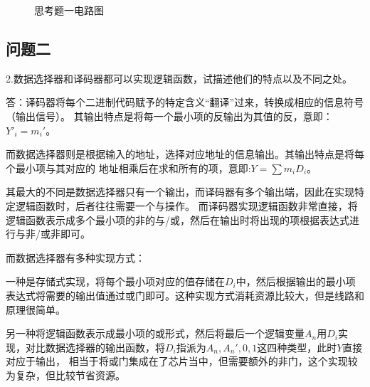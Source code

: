 \documentclass[a4paper,11pt,UTF8]{ctexart}
\begin{document}
\begin{figure}[H]
  \centering
  \caption{思考题一电路图}
  \label{fig:T1}
  \end{figure}
\subsection{问题二}
2.数据选择器和译码器都可以实现逻辑函数，试描述他们的特点以及不同之处。

答：译码器将每个二进制代码赋予的特定含义“翻译”过来，转换成相应的信息符号（输出信号）。
其输出特点是将每一个最小项的反输出为其值的反，意即：$Y'_i=m_i'$。

而数据选择器则是根据输入的地址，选择对应地址的信息输出。其输出特点是将每个最小项与其对应的
地址相乘后在求和所有的项，意即:$Y=\sum m_iD_i$。

其最大的不同是数据选择器只有一个输出，而译码器有多个输出端，因此在实现特定逻辑函数时，后者往往需要一个与操作。
而译码器实现逻辑函数非常直接，将逻辑函数表示成多个最小项的非的与/或，然后在输出时将出现的项根据表达式进行与非/或非即可。

而数据选择器有多种实现方式：

一种是存储式实现，将每个最小项对应的值存储在$D_i$中，然后根据输出的最小项表达式将需要的输出值通过或门即可。这种实现方式消耗资源比较大，但是线路和原理很简单。

另一种将逻辑函数表示成最小项的或形式，然后将最后一个逻辑变量$A_n$用$D_i$实现，对比数据选择器的输出函数，将$D_i$指派为$A_n,A_n',0,1$这四种类型，此时$Y$直接对应于输出，
相当于将或门集成在了芯片当中，但需要额外的非门，这个实现较为复杂，但比较节省资源。
\end{document}
